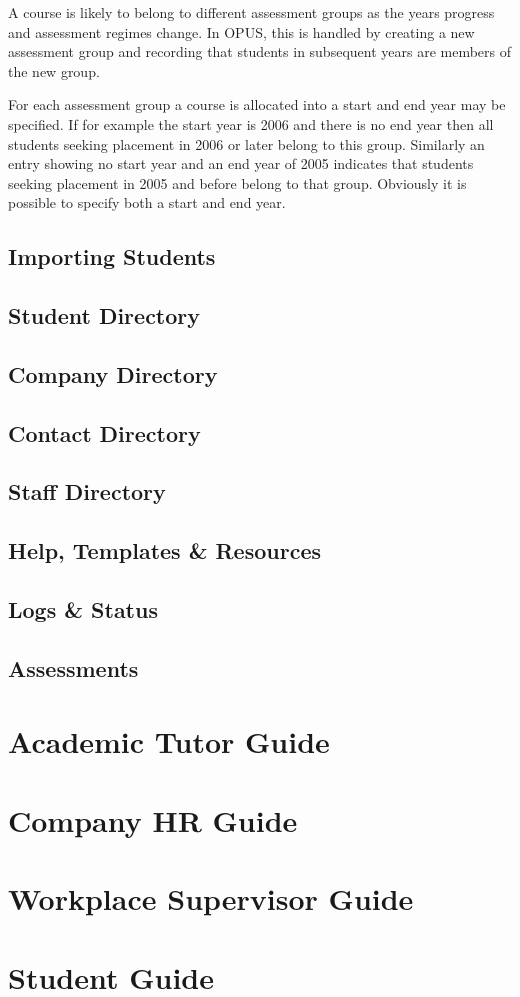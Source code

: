 \documentclass[12 pt]{book}
\begin{document}
A course is likely to belong to different assessment groups as the years progress and
assessment regimes change. In OPUS, this is handled by creating a new assessment group
and recording that students in subsequent years are members of the new group.

For each assessment group a course is allocated into a start and end year may be
specified. If for example the start year is 2006 and there is no end year then all
students seeking placement in 2006 or later belong to this group. Similarly an entry
showing no start year and an end year of 2005 indicates that students seeking
placement in 2005 and before belong to that group. Obviously it is possible to
specify both a start and end year.

\chapter{Importing Students}

\chapter{Student Directory}

\chapter{Company Directory}

\chapter{Contact Directory}

\chapter{Staff Directory}

\chapter{Help, Templates \& Resources}

\chapter{Logs \& Status}

\chapter{Assessments}

\part{Academic Tutor Guide}

\part{Company HR Guide}

\part{Workplace Supervisor Guide}

\part{Student Guide}

%
%

\printindex
{}
\end{document}
